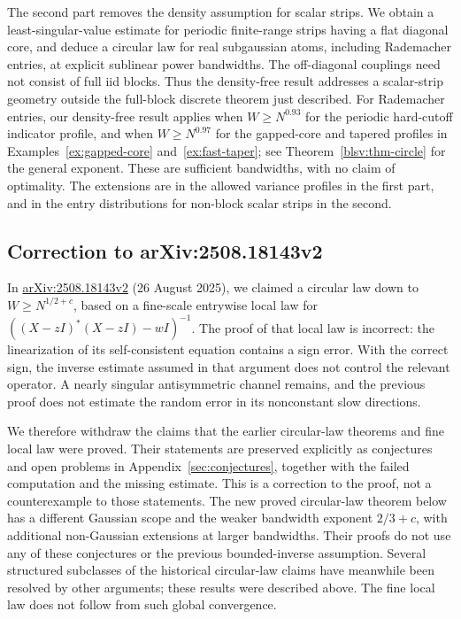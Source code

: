 \documentclass[11pt,reqno]{amsart}
\numberwithin{equation}{section}
\theoremstyle{plain}
\theoremstyle{definition}
\theoremstyle{remark}
\begin{document}
The second part removes the density assumption for scalar strips.
We obtain a least-singular-value estimate for periodic finite-range
strips having a flat diagonal core, and deduce a circular law for real
subgaussian atoms, including Rademacher entries, at explicit sublinear
power bandwidths. The off-diagonal couplings need not consist of full
iid blocks. Thus the density-free result addresses a scalar-strip
geometry outside the full-block discrete theorem just described.
For Rademacher entries, our density-free result applies when
$W\ge N^{0.93}$ for the periodic hard-cutoff indicator profile, and
when $W\ge N^{0.97}$ for the gapped-core and tapered profiles in
Examples~\ref{ex:gapped-core} and~\ref{ex:fast-taper}; see
Theorem~\ref{blsv:thm-circle} for the general exponent.
These are sufficient bandwidths, with no claim of optimality. The extensions
are in the allowed variance profiles in the first part, and in the
entry distributions for non-block scalar strips in the second.

\subsection{Correction to arXiv:2508.18143v2}
In \href{https://arxiv.org/abs/2508.18143v2}{arXiv:2508.18143v2} (26 August 2025), we claimed a circular law down to
$W\geq N^{1/2+c}$, based on a fine-scale entrywise local law for
$((X-zI)^*(X-zI)-wI)^{-1}$. The proof of that local law is incorrect:
the linearization of its self-consistent equation contains a sign error.
With the correct sign, the inverse estimate assumed in that argument does
not control the relevant operator. A nearly singular antisymmetric channel
remains, and the previous proof does not estimate the random error in its
nonconstant slow directions.

We therefore withdraw the claims that the earlier circular-law theorems
and fine local law were proved. Their statements are preserved explicitly
as conjectures and open problems in Appendix~\ref{sec:conjectures}, together
with the failed computation and the missing estimate. This is a correction
to the proof, not a counterexample to those statements. The new proved
circular-law theorem below has a different Gaussian scope and the weaker
bandwidth exponent $2/3+c$, with additional non-Gaussian extensions at
larger bandwidths. Their proofs do not use any of these conjectures or
the previous bounded-inverse assumption. Several structured subclasses of
the historical circular-law claims have meanwhile been resolved by other
arguments; these results were described above. The fine local law does not
follow from such global convergence.
\end{document}
